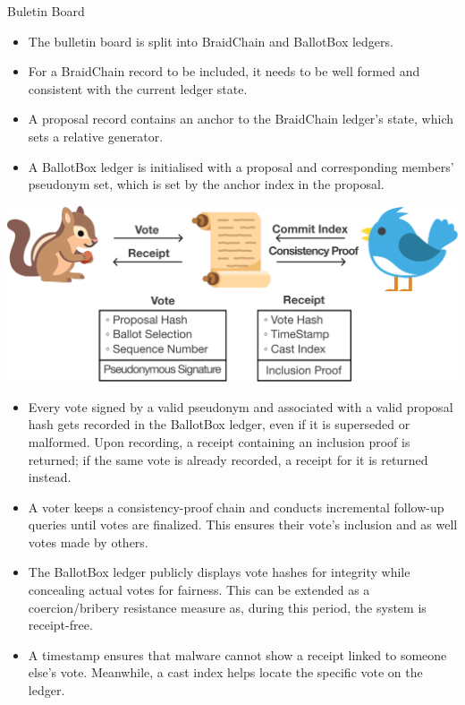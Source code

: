 \documentclass[final]{beamer}
\newlength{\colwidth}
\begin{document}
\begin{frame}[t]
\begin{columns}[t]
\begin{column}{\colwidth}
\begin{block}{Buletin Board}
  \begin{itemize}
  \item The bulletin board is split into BraidChain and BallotBox ledgers.
  \item For a BraidChain record to be included, it needs to be well formed and consistent with the current ledger state.
  \item A proposal record contains an anchor to the BraidChain ledger's state, which sets a relative generator.
  \item A BallotBox ledger is initialised with a proposal and corresponding members' pseudonym set, which is set by the anchor index in the proposal. 
 \end{itemize}

 \begin{center}
   \includegraphics[width=\colwidth]{figures/voting.pdf}  
   \vspace{-2cm}
 \end{center}
 
 \begin{itemize}

 \item Every vote signed by a valid pseudonym and associated with a valid proposal hash gets recorded in the BallotBox ledger, even if it is superseded or malformed. Upon recording, a receipt containing an inclusion proof is returned; if the same vote is already recorded, a receipt for it is returned instead.
  \item A voter keeps a consistency-proof chain and conducts incremental follow-up queries until votes are finalized. This ensures their vote’s inclusion and as well votes made by others.
  \item The BallotBox ledger publicly displays vote hashes for integrity while concealing actual votes for fairness. This can be extended as a coercion/bribery resistance measure as, during this period, the system is receipt-free.
  \item A timestamp ensures that malware cannot show a receipt linked to someone else’s vote. Meanwhile, a cast index helps locate the specific vote on the ledger.


\end{itemize}
\end{block}
\end{column}
\end{columns}
\end{frame}
\end{document}
